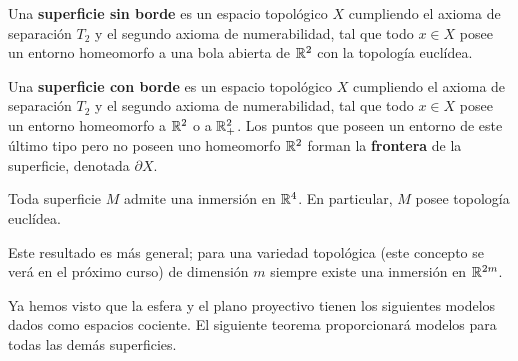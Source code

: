 \documentclass[GTSResumen.tex]{subfiles}
\begin{document}
\begin{defi} Una \textbf{superficie sin borde} es un espacio topológico $X$ cumpliendo el axioma de separación $T_2$ y el segundo axioma de numerabilidad, tal que todo $x\in X$ posee un entorno homeomorfo a una bola abierta de $\mathbb{R}^2$ con la topología euclídea.
\end{defi}

\begin{defi} Una \textbf{superficie con borde} es un espacio topológico $X$ cumpliendo el axioma de separación $T_2$ y el segundo axioma de numerabilidad, tal que todo $x\in X$ posee un entorno homeomorfo a $\mathbb{R}^2$ o a $\mathbb{R}^2_+$. Los puntos que poseen un entorno de este último tipo pero no poseen uno homeomorfo $\mathbb{R}^2$ forman la \textbf{frontera} de la superficie, denotada $\partial X$.
\end{defi}

\begin{teorema} Toda superficie $M$ admite una inmersión en $\mathbb{R}^4$. En particular, $M$ posee topología euclídea. 
\end{teorema}

\begin{nota} Este resultado es más general; para una variedad topológica (este concepto se verá en el próximo curso) de dimensión $m$ siempre existe una inmersión en $\mathbb{R}^{2m}$.
\end{nota}



Ya hemos visto que la esfera y el plano proyectivo tienen los siguientes modelos dados como espacios cociente. El siguiente teorema proporcionará modelos para todas las demás superficies.
\end{document}
